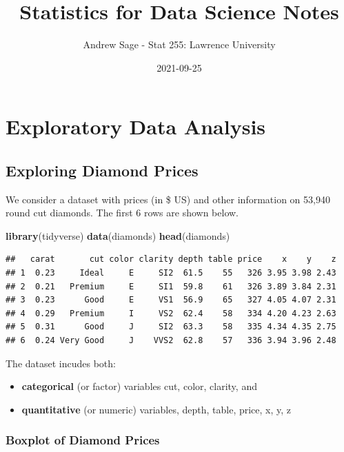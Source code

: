\documentclass[]{book}
\title{Statistics for Data Science Notes}
\author{Andrew Sage - Stat 255: Lawrence University}
\date{2021-09-25}
\newenvironment{Shaded}{\begin{snugshade}}{\end{snugshade}}
\newcommand{\KeywordTok}[1]{\textcolor[rgb]{0.13,0.29,0.53}{\textbf{#1}}}
\newcommand{\NormalTok}[1]{#1}
\providecommand{\tightlist}{%
  \setlength{\itemsep}{0pt}\setlength{\parskip}{0pt}}
\begin{document}
\maketitle

{
\setcounter{tocdepth}{1}
\tableofcontents
}
\chapter{Exploratory Data Analysis}\label{exploratory-data-analysis}

\section{Exploring Diamond Prices}\label{exploring-diamond-prices}

We consider a dataset with prices (in \$ US) and other information on
53,940 round cut diamonds. The first 6 rows are shown below.

\begin{Shaded}
\begin{Highlighting}[]
\KeywordTok{library}\NormalTok{(tidyverse)}
\KeywordTok{data}\NormalTok{(diamonds)}
\KeywordTok{head}\NormalTok{(diamonds)}
\end{Highlighting}
\end{Shaded}

\begin{verbatim}
##   carat       cut color clarity depth table price    x    y    z
## 1  0.23     Ideal     E     SI2  61.5    55   326 3.95 3.98 2.43
## 2  0.21   Premium     E     SI1  59.8    61   326 3.89 3.84 2.31
## 3  0.23      Good     E     VS1  56.9    65   327 4.05 4.07 2.31
## 4  0.29   Premium     I     VS2  62.4    58   334 4.20 4.23 2.63
## 5  0.31      Good     J     SI2  63.3    58   335 4.34 4.35 2.75
## 6  0.24 Very Good     J    VVS2  62.8    57   336 3.94 3.96 2.48
\end{verbatim}

The dataset incudes both:

\begin{itemize}
\tightlist
\item
  \textbf{categorical} (or factor) variables cut, color, clarity, and\\
\item
  \textbf{quantitative} (or numeric) variables, depth, table, price, x,
  y, z
\end{itemize}

\subsection{Boxplot of Diamond Prices}\label{boxplot-of-diamond-prices}
\end{document}
